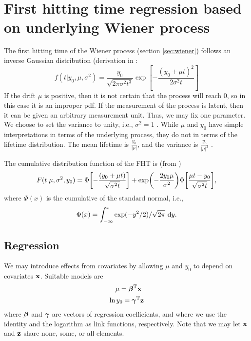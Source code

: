 \section{First hitting time regression based on underlying Wiener process}
The first hitting time of the Wiener process (section \ref{sec:wiener}) follows an inverse Gaussian distribution (derivation in \citet{chhikara1988}:
\begin{equation}
\label{eq:fht-ig}
    f(t|y_0,\mu,\sigma^2)=\frac{y_0}{\sqrt{2\pi\sigma^2t^3}}\exp\left[-\frac{(y_0+\mu t)^2}{2\sigma^2t}\right]
\end{equation}
If the drift $\mu$ is positive, then it is not certain that the process will reach 0, so in this case it is an improper pdf. If the measurement of the process is latent, then it can be given an arbitrary measurement unit. Thus, we may fix one parameter. We choose to set the variance to unity, i.e., $\sigma^2=1$ \citep{leewhitmore2006}. While $\mu$ and $y_0$ have simple interpretations in terms of the underlying process, they do not in terms of the lifetime distribution. The mean lifetime is $\frac{y_0}{|\mu|}$, and the variance is $\frac{y_0}{|\mu|^3}$ \citep[62]{caroni2017}.

The cumulative distribution function of the FHT is (from \citet{threg})
\begin{equation}\label{eq:cumulative}
    F(t|\mu,\sigma^2,y_0)=\Phi\sqb*{-\frac{(y_0+\mu t)}{\sqrt{\sigma^2t}}}+\exp\p*{-\frac{2y_0\mu}{\sigma^2}}\Phi\sqb*{\frac{\mu t-y_0}{\sqrt{\sigma^2t}}},
\end{equation}
where $\Phi(x)$ is the cumulative of the standard normal, i.e.,
\begin{equation}
    \Phi(x)=\int_{-\infty}^x\exp(-y^2/2)/\sqrt{2\pi}\text{~d}y.
\end{equation}

\subsection{Regression}
We may introduce effects from covariates by allowing $\mu$ and $y_0$ to depend on covariates $\mathbf{x}$. Suitable models are
\begin{align}\label{eq:coeffs}
\begin{split}
    \mu=\bbeta^\T\x \\
    \ln y_0=\bgamma^\T\z
\end{split}
\end{align}
where $\boldsymbol{\beta}$ and $\boldsymbol{\gamma}$ are vectors of regression coefficients, and where we use the identity and the logarithm as link functions, respectively. Note that we may let $\mathbf{x}$ and $\mathbf{z}$ share none, some, or all elements.

